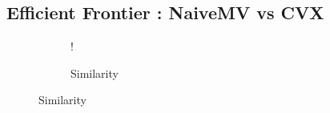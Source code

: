 \documentclass[11pt]{article}
\begin{document}
\subsection{Efficient Frontier : NaiveMV vs CVX}
\begin{figure}[!h]
    \centering 
   \begin{subfigure}[b]{0.45\textwidth}
     	\resizebox {\textwidth} {!} { }
     \caption{Similarity}
    \label{fig:q1-d-naive-v-cvx}
    \end{subfigure}
\end{figure}
\end{document}
